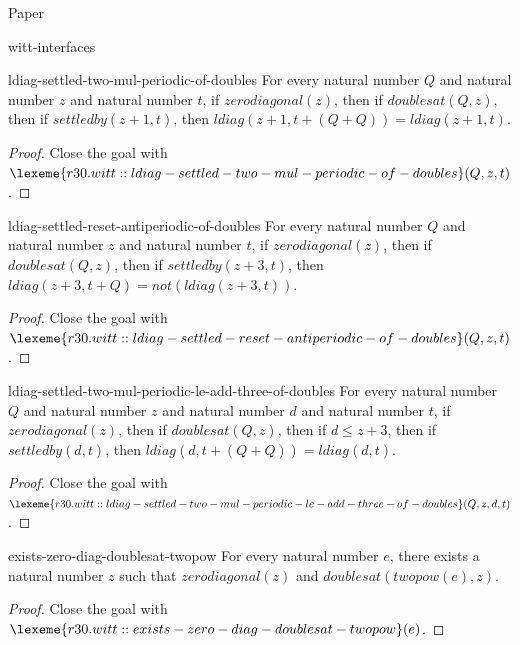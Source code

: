 \begin{lexlean}{Paper}
\begin{section}{witt-interfaces}
  \begin{theorem}{ldiag-settled-two-mul-periodic-of-doubles}
  For every natural number \(Q\) and natural number \(z\) and natural number \(t\), if \(zerodiagonal(z)\), then if \(doublesat(Q, z)\), then if \(settledby(z + 1, t)\), then \(ldiag(z + 1, t + (Q + Q)) = ldiag(z + 1, t)\).
  \begin{proof}
  Close the goal with \(\lexeme{r30.witt::ldiag-settled-two-mul-periodic-of-doubles}(Q, z, t)\).
  \end{proof}
  \end{theorem}

  \begin{theorem}{ldiag-settled-reset-antiperiodic-of-doubles}
  For every natural number \(Q\) and natural number \(z\) and natural number \(t\), if \(zerodiagonal(z)\), then if \(doublesat(Q, z)\), then if \(settledby(z + 3, t)\), then \(ldiag(z + 3, t + Q) = not(ldiag(z + 3, t))\).
  \begin{proof}
  Close the goal with \(\lexeme{r30.witt::ldiag-settled-reset-antiperiodic-of-doubles}(Q, z, t)\).
  \end{proof}
  \end{theorem}

  \begin{theorem}{ldiag-settled-two-mul-periodic-le-add-three-of-doubles}
  For every natural number \(Q\) and natural number \(z\) and natural number \(d\) and natural number \(t\), if \(zerodiagonal(z)\), then if \(doublesat(Q, z)\), then if \(d ≤ z + 3\), then if \(settledby(d, t)\), then \(ldiag(d, t + (Q + Q)) = ldiag(d, t)\).
  \begin{proof}
  Close the goal with \(\lexeme{r30.witt::ldiag-settled-two-mul-periodic-le-add-three-of-doubles}(Q, z, d, t)\).
  \end{proof}
  \end{theorem}

  \begin{theorem}{exists-zero-diag-doublesat-twopow}
  For every natural number \(e\), there exists a natural number \(z\) such that \(zerodiagonal(z)\) and \(doublesat(twopow(e), z)\).
  \begin{proof}
  Close the goal with \(\lexeme{r30.witt::exists-zero-diag-doublesat-twopow}(e)\).
  \end{proof}
  \end{theorem}


\end{section}
\end{lexlean}
